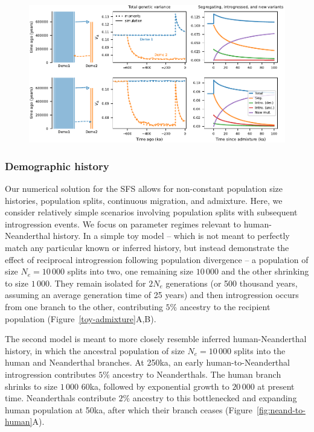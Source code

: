 \documentclass{article}
\begin{document}
\begin{figure}[tb!]
    \centering
    \includegraphics{../figures/reciprocal_admixture.pdf}
    \caption{
        \textbf{}
    }
    \label{fig:toy-admixture}
\end{figure}

\subsubsection*{Demographic history}

Our numerical solution for the SFS allows for non-constant population size
histories, population splits, continuous migration, and admixture. Here, we
consider relatively simple scenarios involving population splits with
subsequent introgression events. We focus on parameter regimes relevant to
human-Neanderthal history. In a simple toy model -- which is not meant to
perfectly match any particular known or inferred history, but instead
demonstrate the effect of reciprocal introgression following population
divergence -- a population of size $N_e=10\,000$ splits into two, one remaining
size $10\,000$ and the other shrinking to size $1\,000$. They remain isolated
for $2N_e$ generations (or 500 thousand years, assuming an average generation
time of 25 years) and then introgression occurs from one branch to the other,
contributing $5\%$ ancestry to the recipient population
(Figure~\ref{toy-admixture}A,B).

The second model is meant to more closely resemble inferred human-Neanderthal
history, in which the ancestral population of size $N_e=10\,000$ splits into
the human and Neanderthal branches. At 250ka, an early human-to-Neanderthal
introgression contributes $5\%$ ancestry to Neanderthals. The human branch
shrinks to size $1\,000$ 60ka, followed by exponential growth to $20\,000$ at
present time. Neanderthals contribute $2\%$ ancestry to this bottlenecked and
expanding human population at 50ka, after which their branch ceases
(Figure~\ref{fig:neand-to-human}A).
\end{document}
